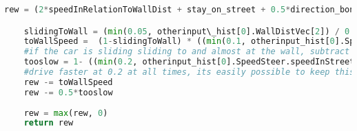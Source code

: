 \begin{lstlisting}[language=Python, frame=none]
	rew = (2*speedInRelationToWallDist + stay_on_street + 0.5*direction_bonus + 0.5*steer)/ 4 

	slidingToWall = (min(0.05, otherinput\_hist[0].WallDistVec[2]) / 0.05)**3
	toWallSpeed =  (1-slidingToWall) * ((min(0.1, otherinput_hist[0].SpeedSteer.velocity) / 0.1)) 
	#if the car is sliding sliding to and almost at the wall, subtract a lot 
	tooslow = 1- ((min(0.2, otherinput_hist[0].SpeedSteer.speedInStreetDir) / 0.2) ** 3)
	#drive faster at 0.2 at all times, its easily possible to keep this at 0 at all times
	rew -= toWallSpeed
	rew -= 0.5*tooslow
	
	rew = max(rew, 0) 
	return rew

\end{lstlisting}%